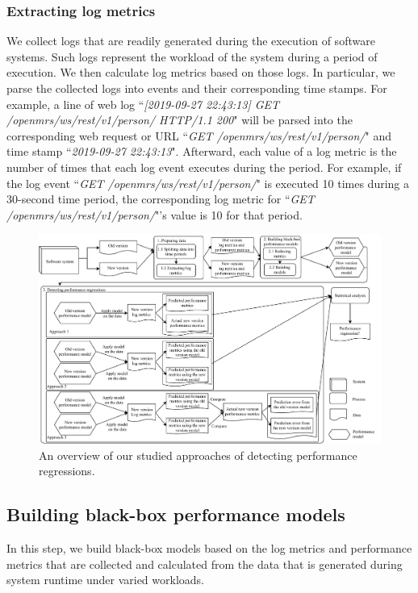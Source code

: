 \subsubsection{Extracting log metrics}
We collect logs that are readily generated during the execution of software systems. Such logs represent the workload of the system during a period of execution. We then calculate log metrics based on those logs. In particular, we parse the collected logs into events and their corresponding time stamps. For example, a line of web log ``\emph{[2019-09-27 22:43:13] GET /openmrs/ws/rest/v1/person/ HTTP/1.1 200}" will be parsed into the corresponding web request or URL ``\emph{GET /openmrs/ws/rest/v1/person/}" and time stamp ``\emph{2019-09-27 22:43:13}". Afterward, each value of a log metric is the number of times that each log event executes during the period. For example, if the log event ``\emph{GET /openmrs/ws/rest/v1/person/}" is executed 10 times during a 30-second time period, the corresponding log metric for ``\emph{GET /openmrs/ws/rest/v1/person/}"’s value is 10 for that period. 

\begin{figure}[tbh]
  \centering
  \includegraphics[width=\textwidth]{overview.pdf}
  \caption{An overview of our studied approaches of detecting performance regressions.}
  \label{fig:overview}
\end{figure}

\subsection{Building black-box performance models}
\label{sec:buildmodel}
In this step, we build black-box models based on the log metrics and performance metrics that are collected and calculated from the data that is generated during system runtime under varied workloads. 


